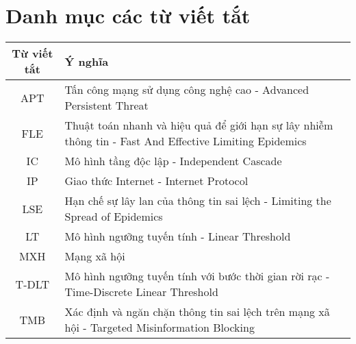 \chapter*{Danh mục các từ viết tắt}
\quad 
\begin{table}[h]
\begin{center}
\large{
\begin{tabular}{|c|p{12cm}|}
\hline
\textbf{Từ viết tắt} & \textbf{Ý nghĩa}\\
\hline
APT & Tấn công mạng sử dụng công nghệ cao - Advanced Persistent Threat\\
\hline
FLE & Thuật toán nhanh và hiệu quả để giới hạn sự lây nhiễm thông tin - Fast And Effective Limiting Epidemics\\
\hline
IC & Mô hình tầng độc lập - Independent Cascade\\
\hline
IP & Giao thức Internet - Internet Protocol\\
\hline
LSE & Hạn chế sự lây lan của thông tin sai lệch - Limiting the Spread of Epidemics\\
\hline
LT & Mô hình ngưỡng tuyến tính - Linear Threshold\\
\hline
MXH & Mạng xã hội\\
\hline
T-DLT & Mô hình ngưỡng tuyến tính với bước thời gian rời rạc - Time-Discrete Linear Threshold\\
\hline
TMB & Xác định và ngăn chặn thông tin sai lệch trên mạng xã hội - Targeted Misinformation Blocking\\
\hline
\end{tabular}
}
\end{center}
\end{table}